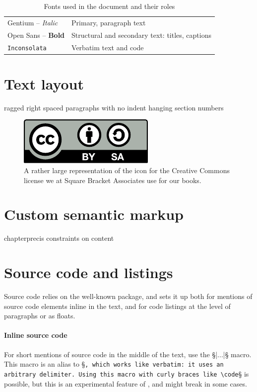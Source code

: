 \documentclass[english,twoside,openany,showtrims]{sbabook}
\begin{document}
\begin{table}[htb]
  \begin{tabular}{ll}
    \toprule
    \textnormal{Gentium -- \textit{Italic}} & Primary, paragraph text \\
    \textsf{Open Sans -- \textbf{Bold}}     & Structural and secondary text: titles, captions \\
    \texttt{Inconsolata}                    & Verbatim text and code \\
    \bottomrule
  \end{tabular}
  \caption{Fonts used in the document and their roles}
  \label{tab:fontRoles}
\end{table}


\section{Text layout}

ragged right
spaced paragraphs with no indent
hanging section numbers

\begin{figure}[tb]
  \includegraphics{CreativeCommons-BY-SA}
  \caption{A rather large representation of the icon for the Creative Commons
    license we at Square Bracket Associates use for our books.}
  \label{fig:cc-by-sa-icon}
\end{figure}

\section{Custom semantic markup}

chapterprecis
constraints on content


\section{Source code and listings}

Source code relies on the well-known  package, and sets it up
both for mentions of source code elements inline in the text, and for code
listings at the level of paragraphs or as floats.


\paragraph{Inline source code}
For short mentions of source code in the middle of the text, use the
\code§\code|...|§ macro.
This macro is an alias to \code§\lstinline§, which works like verbatim: it uses
an arbitrary delimiter.
Using this macro with curly braces like \code§§ is possible, but this
is an experimental feature of , and might break in some cases.
\end{document}
